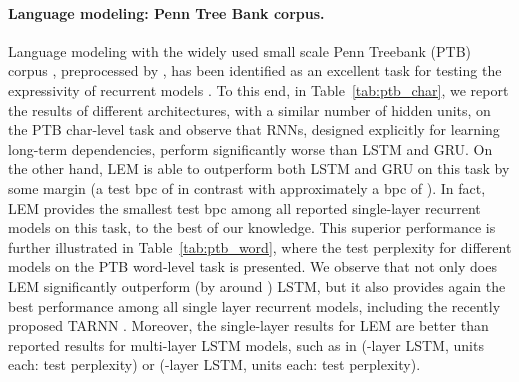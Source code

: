 \documentclass{article} \usepackage{iclr2022_conference,times}
\newcommand{\Tref}[1]{Table~\ref{#1}}
\begin{document}
\paragraph{Language modeling: Penn Tree Bank corpus.}
Language modeling with the widely used small scale Penn Treebank (PTB) corpus \citep{ptb_corpus}, preprocessed by \citet{ptb_prepro}, has been identified as an excellent task for testing the expressivity of recurrent models \citep{nnRNN}. To this end, in \Tref{tab:ptb_char}, we report the results of different architectures, with a similar number of hidden units, on the PTB char-level task and observe that RNNs, designed explicitly for learning long-term dependencies, perform significantly worse than LSTM and GRU. On the other hand, LEM is able to outperform both LSTM and GRU on this task by some margin (a test bpc of  in contrast with approximately a bpc of ). In fact, LEM provides the smallest test bpc among all reported single-layer recurrent models on this task, to the best of our knowledge. 
This superior performance is further illustrated in \Tref{tab:ptb_word}, where the test perplexity for different models on the PTB word-level task is presented. 
We observe that not only does LEM significantly outperform (by around ) LSTM, but it also provides again the best performance among all single layer recurrent models, including the recently proposed TARNN \citep{tarnn}. 
Moreover, the single-layer results for LEM are better than reported results for multi-layer LSTM models, such as in \citet{var_drop} (-layer LSTM,  units each:  test perplexity) or \citet{tcn} (-layer LSTM,  units each:  test perplexity).
\end{document}
